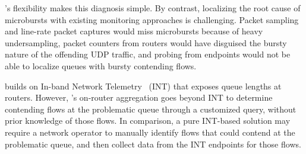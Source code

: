 \TheSystem's flexibility makes this diagnosis simple.
%
By contrast, localizing the root cause of microbursts with existing monitoring
approaches is challenging.
%
Packet sampling and
line-rate packet captures would miss microbursts because of heavy undersampling,
packet counters from routers would have disguised the bursty nature of the
offending UDP traffic, and probing from endpoints would not be able to
localize queues with bursty contending flows.

\TheSystem builds on In-band Network Telemetry~\cite{int, barefoot-demo} (INT)
that exposes queue lengths at routers. However, \TheSystem's on-router
aggregation goes beyond INT to determine contending flows at the problematic
queue through a customized query, without prior knowledge of those flows.
%
In comparison, a pure INT-based solution may require a network operator to
manually identify flows that could contend at the problematic queue, and then collect data
from the INT endpoints for those flows.
